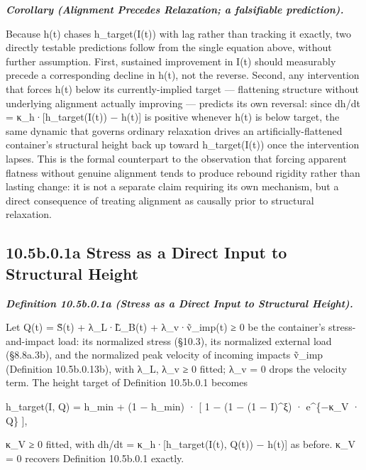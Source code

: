 \documentclass[
]{article}
\begin{document}
\emph{\textbf{Corollary (Alignment Precedes Relaxation; a falsifiable
prediction).}}

Because h(t) chases h\_target(I(t)) with lag rather than tracking it
exactly, two directly testable predictions follow from the single
equation above, without further assumption. First, sustained improvement
in I(t) should measurably precede a corresponding decline in h(t), not
the reverse. Second, any intervention that forces h(t) below its
currently-implied target --- flattening structure without underlying
alignment actually improving --- predicts its own reversal: since dh/dt
= κ\_h·{[}h\_target(I(t)) − h(t){]} is positive whenever h(t) is below
target, the same dynamic that governs ordinary relaxation drives an
artificially-flattened container's structural height back up toward
h\_target(I(t)) once the intervention lapses. This is the formal
counterpart to the observation that forcing apparent flatness without
genuine alignment tends to produce rebound rigidity rather than lasting
change: it is not a separate claim requiring its own mechanism, but a
direct consequence of treating alignment as causally prior to structural
relaxation.

\hypertarget{b.0.1a-stress-as-a-direct-input-to-structural-height}{%
\subsection{10.5b.0.1a Stress as a Direct Input to Structural
Height}\label{b.0.1a-stress-as-a-direct-input-to-structural-height}}

\emph{\textbf{Definition 10.5b.0.1a (Stress as a Direct Input to
Structural Height).}}

Let Q(t) = S̃(t) + λ\_L·L̃\_B(t) + λ\_v·ṽ\_imp(t) ≥ 0 be the container's
stress-and-impact load: its normalized stress (§10.3), its normalized
external load (§8.8a.3b), and the normalized peak velocity of incoming
impacts ṽ\_imp (Definition 10.5b.0.13b), with λ\_L, λ\_v ≥ 0 fitted;
λ\_v = 0 drops the velocity term. The height target of Definition
10.5b.0.1 becomes

h\_target(I, Q) = h\_min + (1 − h\_min) · {[} 1 − (1 − (1 − I)\^{}ξ) ·
e\^{}\{−κ\_V · Q\} {]},

κ\_V ≥ 0 fitted, with dh/dt = κ\_h·{[}h\_target(I(t), Q(t)) − h(t){]} as
before. κ\_V = 0 recovers Definition 10.5b.0.1 exactly.
\end{document}
